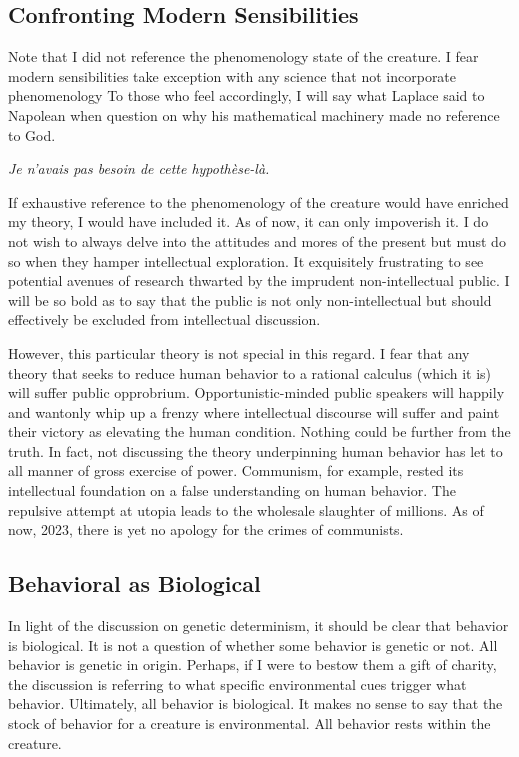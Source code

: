 \documentclass[12pt]{article}
\begin{document}
\subsection{Confronting Modern Sensibilities}
Note that I did not reference the phenomenology state of the creature.
I fear modern sensibilities take exception with any science that not incorporate phenomenology
To those who feel accordingly, I will say what Laplace said to Napolean when question on why his mathematical machinery made no reference to God.

\textit{Je n’avais pas besoin de cette hypothèse-là.}

If exhaustive reference to the phenomenology of the creature would have enriched my theory, I would have included it.
As of now, it can only impoverish it.
I do not wish to always delve into the attitudes and mores of the present but must do so when they hamper intellectual exploration.
It exquisitely frustrating to see potential avenues of research thwarted by the imprudent non-intellectual public.
I will be so bold as to say that the public is not only non-intellectual but should effectively be excluded from intellectual discussion.

However, this particular theory is not special in this regard.
I fear that any theory that seeks to reduce human behavior to a rational calculus (which it is) will suffer public opprobrium.
Opportunistic-minded public speakers will happily and wantonly whip up a frenzy where intellectual discourse will suffer and paint their victory as elevating the human condition.
Nothing could be further from the truth.
In fact, not discussing the theory underpinning human behavior has let to all manner of gross exercise of power.
Communism, for example, rested its intellectual foundation on a false understanding on human behavior.
The repulsive attempt at utopia leads to the wholesale slaughter of millions.
As of now, 2023, there is yet no apology for the crimes of communists.

\subsection{Behavioral as Biological}
In light of the discussion on genetic determinism, it should be clear that behavior is biological.
It is not a question of whether some behavior is genetic or not.
All behavior is genetic in origin.
Perhaps, if I were to bestow them a gift of charity, the discussion is referring to what specific environmental cues trigger what behavior.
Ultimately, all behavior is biological.
It makes no sense to say that the stock of behavior for a creature is environmental.
All behavior rests within the creature.
\end{document}
